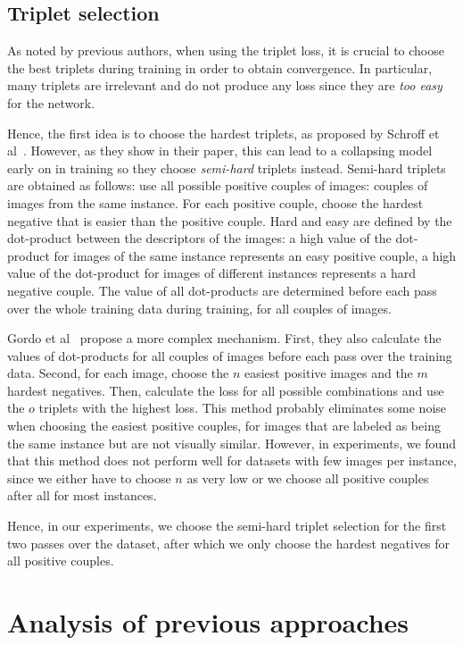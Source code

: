 \subsection{Triplet selection}
As noted by previous authors, when using the triplet loss, it is
crucial to choose the best triplets during training in order to
obtain convergence. In particular, many triplets are irrelevant
and do not produce any loss since they are \emph{too easy} for the network.

Hence, the first idea is to choose the hardest triplets, as proposed by
Schroff et al~\cite{schroff_facenet:_2015}. However, as they show in
their paper, this can lead to a collapsing model early on in training
so they choose  \emph{semi-hard} triplets instead. Semi-hard triplets
are obtained as follows:
use all possible positive couples of images: couples of images from the
same instance. For each positive couple, choose the hardest negative
that is easier than the positive couple. Hard and easy are defined
by the dot-product between the descriptors of the images: a high value
of the dot-product for images of the same instance represents an easy
positive couple, a high value of the dot-product for images of different
instances represents a hard negative couple.
The value of all dot-products are determined before each pass over
the whole training data during training, for all couples of images.

Gordo et al~\cite{gordo_end--end_2016} propose a more complex mechanism.
First, they also calculate the values of dot-products for all couples of
images before each pass over the training data.
Second, for each image, choose the $n$ easiest positive images and the
$m$ hardest negatives. Then, calculate the loss for all possible combinations
and use the $o$ triplets with the highest loss.
This method probably eliminates some noise when choosing the easiest
positive couples, for images that are labeled as being the same instance
but are not visually similar.
However, in experiments, we found that this method does not perform well
for datasets with few images per instance, since we either have to
choose $n$ as very low or we choose all positive couples after all for
most instances.

Hence, in our experiments, we choose the semi-hard triplet selection
for the first two passes over the dataset, after which we only choose
the hardest negatives for all positive couples.

\section{Analysis of previous approaches}\label{sec:analysisprev}
